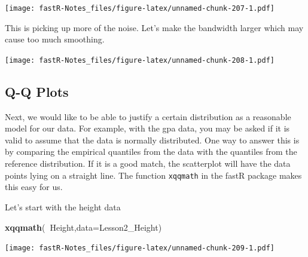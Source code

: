 \documentclass[]{book}
\newenvironment{Shaded}{\begin{snugshade}}{\end{snugshade}}
\newcommand{\KeywordTok}[1]{\textcolor[rgb]{0.13,0.29,0.53}{\textbf{#1}}}
\newcommand{\DataTypeTok}[1]{\textcolor[rgb]{0.13,0.29,0.53}{#1}}
\newcommand{\DecValTok}[1]{\textcolor[rgb]{0.00,0.00,0.81}{#1}}
\newcommand{\StringTok}[1]{\textcolor[rgb]{0.31,0.60,0.02}{#1}}
\newcommand{\OperatorTok}[1]{\textcolor[rgb]{0.81,0.36,0.00}{\textbf{#1}}}
\newcommand{\NormalTok}[1]{#1}
\theoremstyle{definition}
\theoremstyle{definition}
\theoremstyle{definition}
\theoremstyle{remark}
\begin{document}
\begin{Shaded}
\end{Shaded}

\texttt{[image: fastR-Notes\_files/figure-latex/unnamed-chunk-207-1.pdf]}

This is picking up more of the noise. Let's make the bandwidth larger
which may cause too much smoothing.

\begin{Shaded}
\end{Shaded}

\texttt{[image: fastR-Notes\_files/figure-latex/unnamed-chunk-208-1.pdf]}

\subsection{Q-Q Plots}\label{q-q-plots}

Next, we would like to be able to justify a certain distribution as a
reasonable model for our data. For example, with the gpa data, you may
be asked if it is valid to assume that the data is normally distributed.
One way to answer this is by comparing the empirical quantiles from the
data with the quantiles from the reference distribution. If it is a good
match, the scatterplot will have the data points lying on a straight
line. The function \texttt{xqqmath} in the fastR package makes this easy
for us.

Let's start with the height data

\begin{Shaded}
\begin{Highlighting}[]
\KeywordTok{xqqmath}\NormalTok{(}\OperatorTok{~}\NormalTok{Height,}\DataTypeTok{data=}\NormalTok{Lesson2_Height)}
\end{Highlighting}
\end{Shaded}

\texttt{[image: fastR-Notes\_files/figure-latex/unnamed-chunk-209-1.pdf]}
\end{document}
